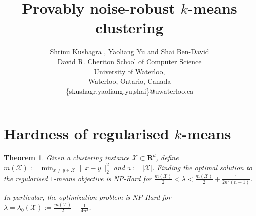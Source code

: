 \documentclass[12pt]{article}
\title{Provably noise-robust $k$-means clustering}
\author{\normalsize
{Shrinu Kushagra} {\textnormal {,}} {Yaoliang Yu} {\textnormal {and}} {Shai Ben-David} \\
\normalsize David R. Cheriton School of Computer Science \\
\normalsize University of Waterloo,\\
\normalsize Waterloo, Ontario, Canada\\
\normalsize \{skushagr,yaoliang.yu,shai\}@uwaterloo.ca \\
}
\newcommand{\mc}{\mathcal}
\newcommand{\mb}{\mathbf}
\newtheorem{theorem}{Theorem}
\begin{document}
\fi

\section{Hardness of regularised $k$-means}
\label{a-section:hardness}
\begin{theorem}
\label{a-theorem:hardFork1Fixed}
Given a clustering instance $\mc X \subset \mb R^{d}$, define $m(\mc X) := \min_{x \neq y \in \mc X} \|x-y\|_{2}^2$ and $n := |\mc X|$. Finding the optimal solution to the regularised $1$-means objective is NP-Hard for $\frac{m(\mc X)}{2} < \lambda < \frac{m(\mc X)}{2} + \frac{1}{2n^2(n-1)}$. 

In particular, the optimization problem is NP-Hard for $\lambda = \lambda_0(\mc X) := \frac{m(\mc X)}{2} + \frac{1}{4n^3}$.
\end{theorem}
\end{document}
